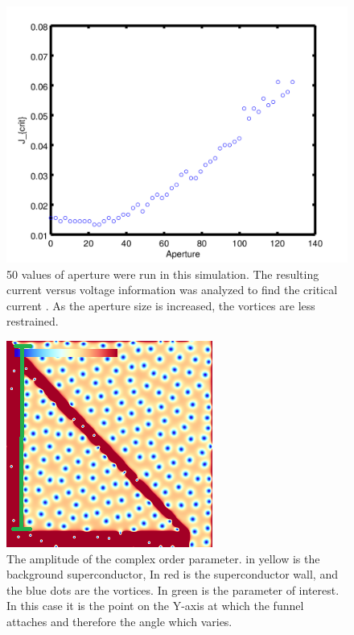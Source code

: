 \begin{figure}[htbp]
\begin{center}
\includegraphics[scale=.50]{oneSideX.png}
\caption{ 50 values of aperture were run in this simulation. The resulting current versus voltage information was analyzed to find the critical current . As the aperture size is increased, the vortices are less restrained. }
\label{oneXscan}
\end{center}
\end{figure}

\begin{figure}[htbp]
\begin{center}
\includegraphics[scale=.50]{oneSidedY.png}
\caption{ The amplitude of the complex order parameter. in yellow is the background superconductor, In red is the superconductor wall, and the blue dots are the vortices. In green is the parameter of interest. In this case it is the point on the Y-axis at which the funnel attaches and therefore the angle which varies.}
\label{oneSidedY}
\end{center}
\end{figure}

